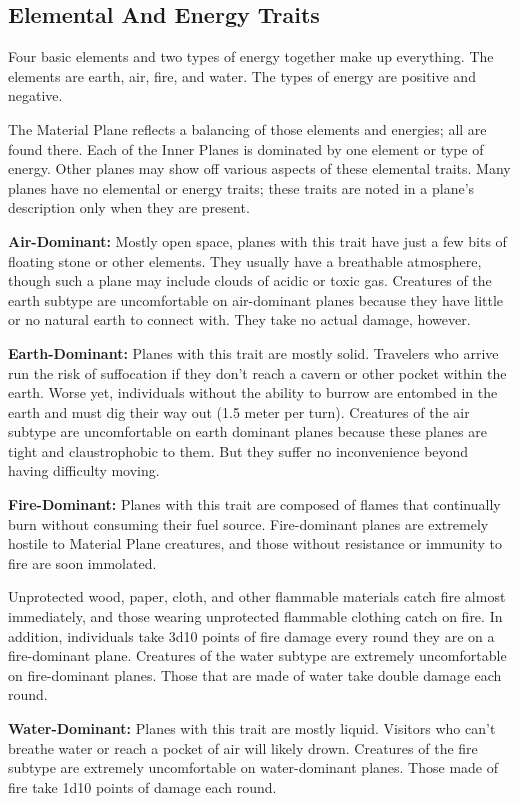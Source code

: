 \subsection{Elemental And Energy Traits}
Four basic elements and two types of energy together make up everything. The elements are earth, air, fire, and water. The types of energy are positive and negative.

The Material Plane reflects a balancing of those elements and energies; all are found there. Each of the Inner Planes is dominated by one element or type of energy. Other planes may show off various aspects of these elemental traits. Many planes have no elemental or energy traits; these traits are noted in a plane's description only when they are present.

\textbf{Air-Dominant:} Mostly open space, planes with this trait have just a few bits of floating stone or other elements. They usually have a breathable atmosphere, though such a plane may include clouds of acidic or toxic gas. Creatures of the earth subtype are uncomfortable on air-dominant planes because they have little or no natural earth to connect with. They take no actual damage, however.

\textbf{Earth-Dominant:} Planes with this trait are mostly solid. Travelers who arrive run the risk of suffocation if they don't reach a cavern or other pocket within the earth. Worse yet, individuals without the ability to burrow are entombed in the earth and must dig their way out (1.5 meter per turn). Creatures of the air subtype are uncomfortable on earth dominant planes because these planes are tight and claustrophobic to them. But they suffer no inconvenience beyond having difficulty moving.

\textbf{Fire-Dominant:} Planes with this trait are composed of flames that continually burn without consuming their fuel source. Fire-dominant planes are extremely hostile to Material Plane creatures, and those without resistance or immunity to fire are soon immolated.

Unprotected wood, paper, cloth, and other flammable materials catch fire almost immediately, and those wearing unprotected flammable clothing catch on fire. In addition, individuals take 3d10 points of fire damage every round they are on a fire-dominant plane. Creatures of the water subtype are extremely uncomfortable on fire-dominant planes. Those that are made of water take double damage each round.

\textbf{Water-Dominant:} Planes with this trait are mostly liquid. Visitors who can't breathe water or reach a pocket of air will likely drown. Creatures of the fire subtype are extremely uncomfortable on water-dominant planes. Those made of fire take 1d10 points of damage each round.

